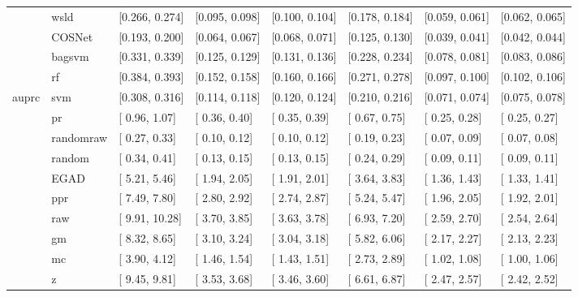 \begin{table}[H]
{\begin{tabular}{llllllll}
 & wsld & [0.266, 0.274] & [0.095, 0.098] & [0.100, 0.104] & [0.178, 0.184] & [0.059, 0.061] & [0.062, 0.065]\\

 & COSNet & [0.193, 0.200] & [0.064, 0.067] & [0.068, 0.071] & [0.125, 0.130] & [0.039, 0.041] & [0.042, 0.044]\\

 & bagsvm & [0.331, 0.339] & [0.125, 0.129] & [0.131, 0.136] & [0.228, 0.234] & [0.078, 0.081] & [0.083, 0.086]\\

 & rf & [0.384, 0.393] & [0.152, 0.158] & [0.160, 0.166] & [0.271, 0.278] & [0.097, 0.100] & [0.102, 0.106]\\

\multirow{-15}{*}{\raggedright\arraybackslash auprc} & svm & [0.308, 0.316] & [0.114, 0.118] & [0.120, 0.124] & [0.210, 0.216] & [0.071, 0.074] & [0.075, 0.078]\\
\cmidrule{1-8}
 & pr & [ 0.96,  1.07] & [ 0.36,  0.40] & [ 0.35,  0.39] & [ 0.67,  0.75] & [ 0.25,  0.28] & [ 0.25,  0.27]\\

 & randomraw & [ 0.27,  0.33] & [ 0.10,  0.12] & [ 0.10,  0.12] & [ 0.19,  0.23] & [ 0.07,  0.09] & [ 0.07,  0.08]\\

 & random & [ 0.34,  0.41] & [ 0.13,  0.15] & [ 0.13,  0.15] & [ 0.24,  0.29] & [ 0.09,  0.11] & [ 0.09,  0.11]\\

 & EGAD & [ 5.21,  5.46] & [ 1.94,  2.05] & [ 1.91,  2.01] & [ 3.64,  3.83] & [ 1.36,  1.43] & [ 1.33,  1.41]\\

 & ppr & [ 7.49,  7.80] & [ 2.80,  2.92] & [ 2.74,  2.87] & [ 5.24,  5.47] & [ 1.96,  2.05] & [ 1.92,  2.01]\\

 & raw & [ 9.91, 10.28] & [ 3.70,  3.85] & [ 3.63,  3.78] & [ 6.93,  7.20] & [ 2.59,  2.70] & [ 2.54,  2.64]\\

 & gm & [ 8.32,  8.65] & [ 3.10,  3.24] & [ 3.04,  3.18] & [ 5.82,  6.06] & [ 2.17,  2.27] & [ 2.13,  2.23]\\

 & mc & [ 3.90,  4.12] & [ 1.46,  1.54] & [ 1.43,  1.51] & [ 2.73,  2.89] & [ 1.02,  1.08] & [ 1.00,  1.06]\\

 & z & [ 9.45,  9.81] & [ 3.53,  3.68] & [ 3.46,  3.60] & [ 6.61,  6.87] & [ 2.47,  2.57] & [ 2.42,  2.52]\\


\end{tabular}}
\end{table}
